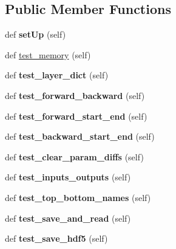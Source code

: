 \subsection*{Public Member Functions}
\begin{DoxyCompactItemize}
\item 
\mbox{\label{classtest__net_1_1_test_net_a864f6fa941b5e7f59b9eee6a676f9604}} 
def {\bfseries set\+Up} (self)
\item 
def \mbox{\hyperlink{classtest__net_1_1_test_net_a124e87079f074a8333dd71e9742e6118}{test\+\_\+memory}} (self)
\item 
\mbox{\label{classtest__net_1_1_test_net_af6fcb0cd3ba57ebbd555667b456b78d5}} 
def {\bfseries test\+\_\+layer\+\_\+dict} (self)
\item 
\mbox{\label{classtest__net_1_1_test_net_a193ec22a0394c6df9e8c0143c7768462}} 
def {\bfseries test\+\_\+forward\+\_\+backward} (self)
\item 
\mbox{\label{classtest__net_1_1_test_net_acf9421180a1199365e45627436f755c1}} 
def {\bfseries test\+\_\+forward\+\_\+start\+\_\+end} (self)
\item 
\mbox{\label{classtest__net_1_1_test_net_a7d9a287bce9ae674b3544acebed8eb4f}} 
def {\bfseries test\+\_\+backward\+\_\+start\+\_\+end} (self)
\item 
\mbox{\label{classtest__net_1_1_test_net_ac6ccca0068d86a8576a00524e76b6b57}} 
def {\bfseries test\+\_\+clear\+\_\+param\+\_\+diffs} (self)
\item 
\mbox{\label{classtest__net_1_1_test_net_a98366efc38e1ebc3346b33c73159624b}} 
def {\bfseries test\+\_\+inputs\+\_\+outputs} (self)
\item 
\mbox{\label{classtest__net_1_1_test_net_aab8c3834499f18db0a49f450f59442f8}} 
def {\bfseries test\+\_\+top\+\_\+bottom\+\_\+names} (self)
\item 
\mbox{\label{classtest__net_1_1_test_net_aa7d8ffffb4ba5827744bb22a79135fe7}} 
def {\bfseries test\+\_\+save\+\_\+and\+\_\+read} (self)
\item 
\mbox{\label{classtest__net_1_1_test_net_a0ba8baa393d50ce4c8a135745c30e9c1}} 
def {\bfseries test\+\_\+save\+\_\+hdf5} (self)
\end{DoxyCompactItemize}
